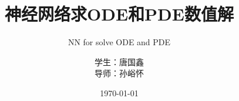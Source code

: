 \documentclass[hyperref,UTF8,11pt]{beamer}
\title[NN-ODE-PDE]{神经网络求ODE和PDE数值解}
\subtitle{NN for solve ODE and PDE}
\author[唐国鑫]{学生：唐国鑫\quad  \\ 导师：孙峪怀\quad \\\quad}
\institute[数学科学学院]{SICNU \quad 数学科学学院}
\date{\today} %
\begin{document}
\newcommand{\redstress}[1]{{\color{red}{#1}}}
\renewcommand{\contentsname}{目录}     %
\renewcommand{\abstractname}{摘要}     %
\renewcommand{\refname}{参考文献}      %
\renewcommand{\indexname}{索引}
\renewcommand{\figurename}{图}
\renewcommand{\tablename}{表}
\renewcommand{\appendixname}{附录}
\begin{frame}
\maketitle
\end{frame}
\end{document}
